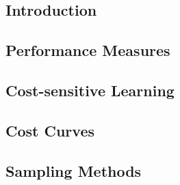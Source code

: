 

\subsection{Introduction}


\subsection{Performance Measures}


\subsection{Cost-sensitive Learning}






\subsection{Cost Curves}




\subsection{Sampling Methods}


